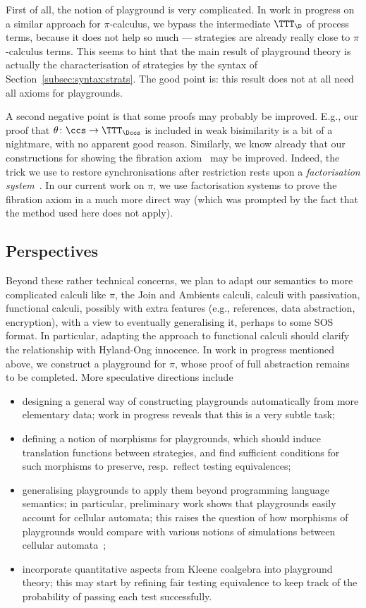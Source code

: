 \documentclass{LMCS}
\theoremstyle{plain}\newtheorem{satz}[thm]{Satz}
\begin{document}
First of all, the notion of playground is very complicated.  In work
in progress on a similar approach for $\pi$-calculus, we bypass the
intermediate \lts{} $\TTT_\D$ of process terms, because it does not help so
much ---  strategies are already really close to $\pi$-calculus
terms.  This seems to hint that the main result of playground theory
is actually the characterisation of strategies by the syntax of
Section~\ref{subsec:syntax:strats}. The good point is: this result
does not at all need all axioms for playgrounds.

A second negative point is that some proofs may probably be improved.
E.g., our proof that $\theta \colon \ccs \to \TTT_{\Dccs}$ is included
in weak bisimilarity is a bit of a nightmare, with no apparent good
reason.  Similarly, we know already that our constructions for showing
the fibration axiom~ may be improved. Indeed, the
trick we use to restore synchronisations after restriction rests upon
a \emph{factorisation system}~\cite{FK,Joyal:ncatlab:facto}.  In our
current work on $\pi$, we use factorisation systems to prove the
fibration axiom in a much more direct way (which was prompted by the
fact that the method used here does not apply).
 
\subsection{Perspectives}
Beyond these rather technical concerns, we plan to adapt our semantics
to more complicated calculi like $\pi$, the Join and Ambients calculi,
calculi with passivation, functional calculi, possibly with extra
features (e.g., references, data abstraction, encryption), with a view
to eventually generalising it, perhaps to some SOS format.  In
particular, adapting the approach to functional calculi should clarify
the relationship with Hyland-Ong innocence.  In work in progress
mentioned above, we construct a playground for $\pi$, whose proof of
full abstraction remains to be completed. More speculative directions
include
\begin{itemize}
\item designing a general way of constructing playgrounds
  automatically from more elementary data; work in progress reveals
  that this is a very subtle task;
\item defining a notion of morphisms for playgrounds, which should
  induce translation functions between strategies, and find sufficient
  conditions for such morphisms to preserve, resp.\ reflect testing
  equivalences;
\item generalising playgrounds to apply them beyond programming
  language semantics; in particular, preliminary work shows that
  playgrounds easily account for cellular automata; this raises the
  question of how morphisms of playgrounds would compare with various
  notions of simulations between cellular
  automata~\cite{DBLP:journals/tcs/DelormeMOT11};
\item incorporate quantitative aspects from Kleene coalgebra into
  playground theory; this may start by refining fair testing
  equivalence to keep track of the probability of passing each test
  successfully.
\end{itemize}
\end{document}
